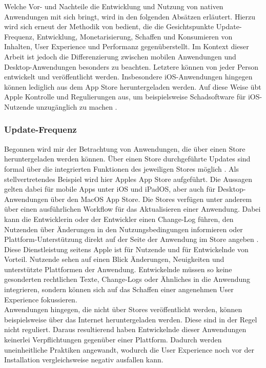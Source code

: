 \documentclass[a4paper]{scrartcl}
\begin{document}
 Welche Vor- und Nachteile die Entwicklung und Nutzung von nativen Anwendungen mit sich bringt, wird in den folgenden Absätzen erläutert. Hierzu wird sich erneut der Methodik von \textcite[28]{Jobe} bedient, die die Gesichtspunkte Update-Frequenz, Entwicklung, Monetarisierung, Schaffen und Konsumieren von Inhalten, User Experience und Performanz gegenüberstellt. Im Kontext dieser Arbeit ist jedoch die Differenzierung zwischen mobilen Anwendungen und Desktop-Anwendungen besonders zu beachten. Letztere können von jeder Person entwickelt und veröffentlicht werden. Insbesondere iOS-Anwendungen hingegen können lediglich aus dem App Store heruntergeladen werden. Auf diese Weise übt Apple Kontrolle und Regulierungen aus, um beispielsweise Schadsoftware für iOS-Nutzende unzugänglich zu machen \autocite{Appstore_Guildelines}.


\subsubsection{Update-Frequenz}

Begonnen wird mir der Betrachtung von Anwendungen, die über einen Store heruntergeladen werden können. Über einen Store durchgeführte Updates sind formal über die integrierten Funktionen des jeweiligen Stores möglich \autocite[28]{Jobe}. Als stellvertretendes Beispiel wird hier Apples App Store aufgeführt. Die Aussagen gelten dabei für mobile Apps unter iOS und iPadOS, aber auch für Desktop-Anwendungen über den MacOS App Store. Die Stores verfügen unter anderem über einen ausführlichen Workflow für das Aktualisieren einer Anwendung. Dabei kann die Entwicklerin oder der Entwickler einen Change-Log führen, den Nutzenden über Änderungen in den Nutzungsbedingungen informieren oder Plattform-Unterstützung direkt auf der Seite der Anwendung im Store angeben \autocite{Appstore_Updates}. \\
Diese Dienstleistung seitens Apple ist für Nutzende und für Entwickelnde von Vorteil. Nutzende sehen auf einen Blick Änderungen, Neuigkeiten und unterstützte Plattformen der Anwendung. Entwickelnde müssen so keine gesonderten rechtlichen Texte, Change-Logs oder Ähnliches in die Anwendung integrieren, sondern können sich auf das Schaffen einer angenehmen User Experience fokussieren. \\

Anwendungen hingegen, die nicht über Stores veröffentlicht werden, können beispielsweise über das Internet heruntergeladen werden. Diese sind in der Regel nicht reguliert. Daraus resultierend haben Entwickelnde dieser Anwendungen keinerlei Verpflichtungen gegenüber einer Plattform. Dadurch werden uneinheitliche Praktiken angewandt, wodurch die User Experience noch vor der Installation vergleichsweise negativ ausfallen kann. 
\end{document}

